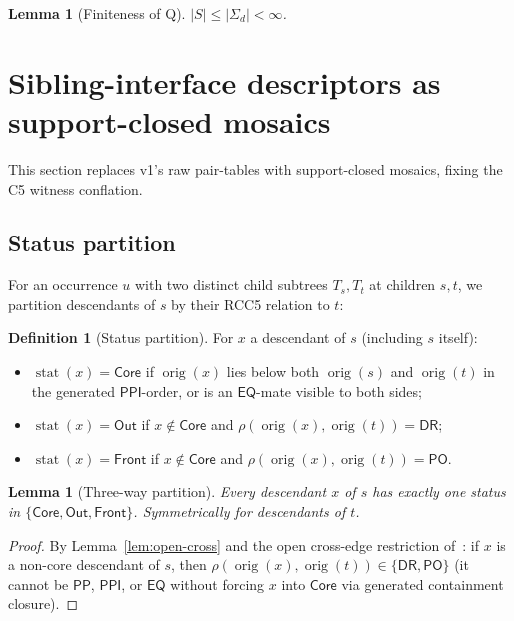 \documentclass[11pt]{article}
\newtheorem{lemma}[theorem]{Lemma}
\theoremstyle{definition}
\newtheorem{definition}[theorem]{Definition}
\theoremstyle{remark}
\newcommand{\DR}{\mathsf{DR}}
\newcommand{\PO}{\mathsf{PO}}
\newcommand{\PP}{\mathsf{PP}}
\newcommand{\PPI}{\mathsf{PPI}}
\newcommand{\EQ}{\mathsf{EQ}}
\newcommand{\sst}{\operatorname{stat}}
\newcommand{\orig}{\operatorname{orig}}
\newcommand{\Core}{\mathsf{Core}}
\newcommand{\Out}{\mathsf{Out}}
\newcommand{\Front}{\mathsf{Front}}
\begin{document}
\begin{lemma}[Finiteness of Q]\label{lem:finite-Q}
$|S| \le |\Sigma_d| < \infty$.
\end{lemma}


\section{Sibling-interface descriptors as support-closed mosaics}
\label{sec:mosaics}

This section replaces v1's raw pair-tables with support-closed
mosaics, fixing the C5 witness conflation.

\subsection{Status partition}

For an occurrence $u$ with two distinct child subtrees $T_s, T_t$
at children $s, t$, we partition descendants of $s$ by their RCC5
relation to $t$:

\begin{definition}[Status partition]\label{def:status}
For $x$ a descendant of $s$ (including $s$ itself):
\begin{itemize}
\item $\sst{}(x) = \Core$ if $\orig(x)$ lies below both $\orig(s)$
  and $\orig(t)$ in the generated $\PPI$-order, or is an
  $\EQ$-mate visible to both sides;
\item $\sst{}(x) = \Out$ if $x \notin \Core$ and
  $\rho(\orig(x),\orig(t)) = \DR$;
\item $\sst{}(x) = \Front$ if $x \notin \Core$ and
  $\rho(\orig(x),\orig(t)) = \PO$.
\end{itemize}
\end{definition}

\begin{lemma}[Three-way partition]\label{lem:status-partition}
Every descendant $x$ of $s$ has exactly one status in
$\{\Core, \Out, \Front\}$.  Symmetrically for descendants of $t$.
\end{lemma}

\begin{proof}
By Lemma~\ref{lem:open-cross} and the open cross-edge restriction
of~\cite[Theorem~1.4]{SplitForest}: if $x$ is a non-core descendant
of $s$, then $\rho(\orig(x),\orig(t)) \in \{\DR,\PO\}$ (it cannot
be $\PP$, $\PPI$, or $\EQ$ without forcing $x$ into $\Core$ via
generated containment closure).
\end{proof}
\end{document}
